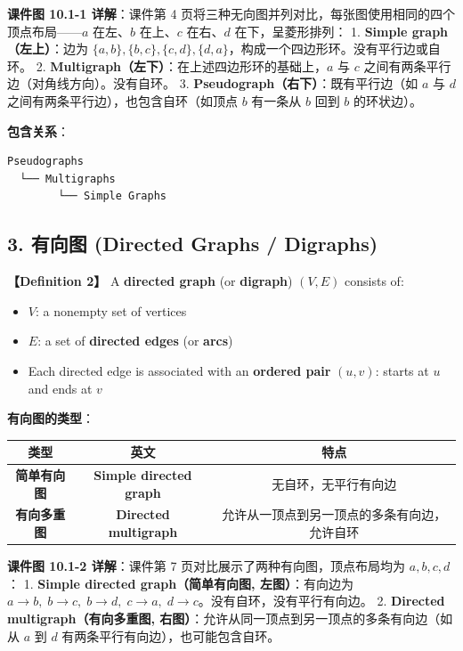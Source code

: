 \documentclass[10pt,a4paper,openany]{ctexbook}
\theoremstyle{definition}
\theoremstyle{remark}
\renewenvironment{quote}
  {\list{}{\leftmargin=1em\rightmargin=0pt\topsep=0.5pt\partopsep=0pt}\item[]}
  {\endlist}
\begin{document}
\begin{quote}
\textbf{课件图 10.1-1 详解}：课件第 4 页将三种无向图并列对比，每张图使用相同的四个顶点布局——$a$ 在左、$b$ 在上、$c$ 在右、$d$ 在下，呈菱形排列：
1. \textbf{Simple graph（左上）}：边为 $\{a,b\},\{b,c\},\{c,d\},\{d,a\}$，构成一个四边形环。没有平行边或自环。
2. \textbf{Multigraph（左下）}：在上述四边形环的基础上，$a$ 与 $c$ 之间有两条平行边（对角线方向）。没有自环。
3. \textbf{Pseudograph（右下）}：既有平行边（如 $a$ 与 $d$ 之间有两条平行边），也包含自环（如顶点 $b$ 有一条从 $b$ 回到 $b$ 的环状边）。

\textbf{包含关系}：
{\footnotesize\begin{verbatim}
Pseudographs
  └── Multigraphs
        └── Simple Graphs
\end{verbatim}}


\end{quote}
\vspace{-2pt}

\subsection{3. 有向图 (Directed Graphs / Digraphs)}

\textbf{【Definition 2】} A \textbf{directed graph} (or \textbf{digraph}) $(V, E)$ consists of:
\begin{itemize}
\item $V$: a nonempty set of vertices
\item $E$: a set of \textbf{directed edges} (or \textbf{arcs})
\item Each directed edge is associated with an \textbf{ordered pair} $(u, v)$: starts at $u$ and ends at $v$

\end{itemize}

\textbf{有向图的类型}：
\begin{center}
\begin{tabular}{ccc}
\hline
类型 & 英文 & 特点 \\ \hline
\textbf{简单有向图} & \textbf{Simple directed graph} & 无自环，无平行有向边 \\
\textbf{有向多重图} & \textbf{Directed multigraph} & 允许从一顶点到另一顶点的多条有向边，允许自环 \\
\hline
\end{tabular}

\end{center}

\begin{quote}
\textbf{课件图 10.1-2 详解}：课件第 7 页对比展示了两种有向图，顶点布局均为 $a,b,c,d$：
1. \textbf{Simple directed graph（简单有向图, 左图）}：有向边为 $a\to b,\; b\to c,\; b\to d,\; c\to a,\; d\to c$。没有自环，没有平行有向边。
2. \textbf{Directed multigraph（有向多重图, 右图）}：允许从同一顶点到另一顶点的多条有向边（如从 $a$ 到 $d$ 有两条平行有向边），也可能包含自环。

\end{quote}
\vspace{-2pt}
\end{document}
